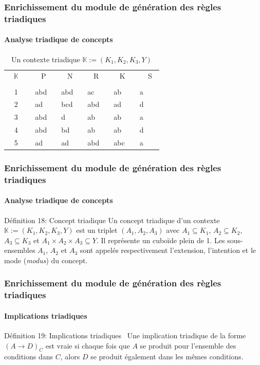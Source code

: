 \documentclass[french]{beamer}
\def\KK{\mathbb{K}}
\begin{document}
\begin{frame}
\frametitle{Enrichissement du module de génération des règles triadiques}
\framesubtitle{Analyse triadique de concepts}
\begin{table}[H]
\scriptsize
\begin{center}
\begin{tabular}{|c| p{20pt} | p{20pt} | p{20pt} | p{20pt} | p{20pt} |}\hline
 ~ $\KK$ ~& ~ ~P~ &  ~ ~N~ & ~ ~R~  &  ~ ~K~ & ~ ~ S~  \\
 &  &  &  &   &   \\ \hline
1 & ~abd~ & ~abd~ & ~ac~ & ~ab~ & ~a~  \\
2 & ~ad~ & ~bcd~ & ~abd~ & ~ad~ & ~d ~ \\
3 & ~abd~ & ~d~ & ~ab~ & ~ab~ & ~a~  \\
4 & ~abd~  & ~bd~ & ~ab~ & ~ab~ & ~d~ \\
5 & ~ad~  & ~ad~ & ~abd~ & ~abc~ & ~a~ \\\hline
\end{tabular}
\caption{Un contexte triadique $\KK:=(K_1, K_2, K_3, Y)$}
\label{Tab:TC}
\end{center}
\end{table}
\end{frame}
\begin{frame}
\frametitle{Enrichissement du module de génération des règles triadiques}
\framesubtitle{Analyse triadique de concepts}
\begin{block}{Définition 18: Concept triadique}
Un concept triadique d'un contexte $\KK:=(K_1,K_2,K_3,Y)$ 
 est un triplet $(A_1, A_2, A_3)$ avec $A_1 \subseteq K_1$, $A_2 \subseteq K_2$, $A_3 \subseteq K_3$ et  $A_1{\times}A_2{\times}A_3\subseteq Y$. Il représente un cuboïde plein de 1. Les sous-ensembles $A_1$, $A_2$ et $A_3$ sont appelés respectivement l'extension, l'intention et le mode (\emph{modus}) du concept.
\end{block}
\end{frame}
\begin{frame}
\frametitle{Enrichissement du module de génération des règles triadiques}
\framesubtitle{Implications triadiques}
\begin{block}{Définition 19: Implications triadiques~\parencite{Biedermann1997}}
Une implication triadique de la forme $(A \rightarrow D)_C$ est vraie si chaque fois que $A$ se produit pour l'ensemble des conditions dans $C$, alors $D$ se produit également dans les mêmes conditions. 
\end{block}
\end{frame}
\end{document}
